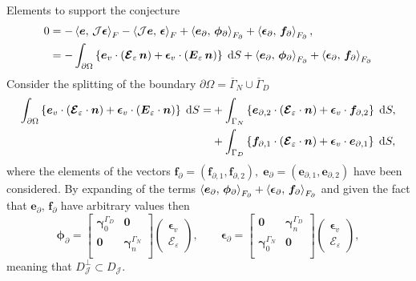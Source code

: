 \begin{conjecture}
\begin{paragraph}{Elements to support the conjecture}
\begin{align*}
0 &=-\inner[F]{\bm{e}}{\mathcal{J}\bm{\epsilon}} - \inner[F]{\mathcal{J}\bm{e}}{\bm{\epsilon}}+ \inner[F_\partial]{\bm{e}_{\partial}}{\bm{\phi}_{\partial}} +  \inner[F_\partial]{\bm{\epsilon}_{\partial}}{\bm{f}_{\partial}}, \\
&=-\int_{\partial\Omega} \left\{\bm{e}_v \cdot (\bm{\mathcal{E}}_\varepsilon \, \bm{n}) + \bm{\epsilon}_v \cdot (\bm{{E}}_\varepsilon \, \bm{n})\right\}  \d{S} + \inner[F_\partial]{\bm{e}_{\partial}}{\bm{\phi}_{\partial}} +  \inner[F_\partial]{\bm{\epsilon}_{\partial}}{\bm{f}_{\partial}}
\end{align*}
Consider the splitting of the boundary $\partial\Omega = \overline{\Gamma}_N \cup \overline{\Gamma}_D$
\begin{align*}
	\int_{\partial\Omega} \left\{\bm{e}_v \cdot (\bm{\mathcal{E}}_\varepsilon \cdot \bm{n}) + \bm{\epsilon}_v \cdot (\bm{{E}}_\varepsilon \cdot \bm{n})\right\}  \d{S} 
	=& +\int_{\Gamma_N} \left\{\bm{e}_{\partial, 2} \cdot (\bm{\mathcal{E}}_\varepsilon \cdot \bm{n}) + \bm{\epsilon}_v \cdot \bm{f}_{\partial, 2}\right\}  \d{S}, \\
	&+ \int_{\Gamma_D} \left\{\bm{f}_{\partial, 1} \cdot (\bm{\mathcal{E}}_\varepsilon \cdot \bm{n}) + \bm{\epsilon}_v \cdot \bm{e}_{\partial, 1}\right\}  \d{S},
\end{align*}
where the elements of the vectors $\bm{f}_{\partial} = (\bm{f}_{\partial, 1}, \bm{f}_{\partial, 2}), \; \bm{e}_{\partial} = (\bm{e}_{\partial, 1}, \bm{e}_{\partial, 2})$ have been considered. By expanding of the terms $\inner[F_\partial]{\bm{e}_{\partial}}{\bm{\phi}_{\partial}} +  \inner[F_\partial]{\bm{\epsilon}_{\partial}}{\bm{f}_{\partial}}$ and given the fact that $\bm{e}_\partial, \, \bm{f}_\partial$ have arbitrary values then
\begin{equation*}
\bm{\phi}_{\partial} = \begin{bmatrix}
\bm\gamma_{0}^{\Gamma_D} & \bm{0} \\
\bm{0} & \bm\gamma_n^{\Gamma_N} \\
\end{bmatrix} \begin{pmatrix}
\bm{\epsilon}_v \\
\bm{\mathcal{E}}_\varepsilon
\end{pmatrix}, \qquad 
\bm{\epsilon}_{\partial} = 
\begin{bmatrix}
\bm{0} & \bm\gamma_{n}^{\Gamma_D} \\
\bm\gamma_0^{\Gamma_N} & \bm{0} \\
\end{bmatrix}
\begin{pmatrix}
\bm{\epsilon}_v \\
\bm{\mathcal{E}}_\varepsilon
\end{pmatrix},
\end{equation*}
meaning that ${D}_{\mathcal{J}}^\perp \subset {D}_{\mathcal{J}}$. 
\end{paragraph}

\end{conjecture}
